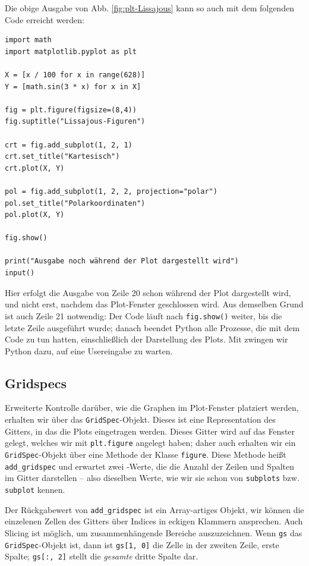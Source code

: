 Die obige Ausgabe von Abb. \ref{fig:plt-Lissajous} kann so auch mit dem folgenden Code erreicht werden:
\begin{codebox}
\begin{verbatim}
import math
import matplotlib.pyplot as plt

X = [x / 100 for x in range(628)]
Y = [math.sin(3 * x) for x in X]

fig = plt.figure(figsize=(8,4))
fig.suptitle("Lissajous-Figuren")

crt = fig.add_subplot(1, 2, 1)
crt.set_title("Kartesisch")
crt.plot(X, Y)

pol = fig.add_subplot(1, 2, 2, projection="polar")
pol.set_title("Polarkoordinaten")
pol.plot(X, Y)

fig.show()

print("Ausgabe noch während der Plot dargestellt wird")
input()
\end{verbatim}
\end{codebox}

Hier erfolgt die Ausgabe von Zeile 20 schon während der Plot dargestellt wird, und nicht erst, nachdem das Plot-Fenster geschlossen wird. Aus demselben Grund ist auch Zeile 21 notwendig: Der Code läuft nach \texttt{fig.show()} weiter, bis die letzte Zeile ausgeführt wurde; danach beendet Python alle Prozesse, die mit dem Code zu tun hatten, einschließlich der Darstellung des Plots. Mit  zwingen wir Python dazu, auf eine Usereingabe zu warten.

\subsection{Gridspecs}
Erweiterte Kontrolle darüber, wie die Graphen im Plot-Fenster platziert werden, erhalten wir über das \texttt{GridSpec}-Objekt. Dieses ist eine Representation des Gitters, in das die Plots eingetragen werden. Dieses Gitter wird auf das Fenster gelegt, welches wir mit \texttt{plt.figure} angelegt haben; daher auch erhalten wir ein \texttt{GridSpec}-Objekt über eine Methode der Klasse \texttt{figure}. Diese Methode heißt \texttt{add\_gridspec} und erwartet zwei -Werte, die die Anzahl der Zeilen und Spalten im Gitter darstellen -- also dieselben Werte, wie wir sie schon von \texttt{subplots} bzw. \texttt{subplot} kennen.

Der Rückgabewert von \texttt{add\_gridspec} ist ein Array-artiges Objekt, \ie wir können die einzelenen Zellen des Gitters über Indices in eckigen Klammern ansprechen. Auch Slicing ist möglich, um zusammenhängende Bereiche auszuzeichnen. Wenn \texttt{gs} das \texttt{GridSpec}-Objekt ist, dann ist \texttt{gs[1, 0]} die Zelle in der zweiten Zeile, erste Spalte; \texttt{gs[:, 2]} stellt die \emph{gesamte} dritte Spalte dar.


